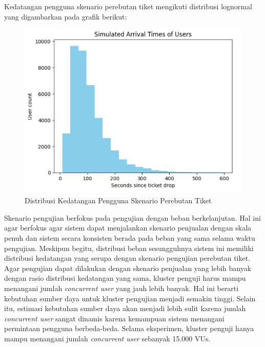 Kedatangan pengguna skenario perebutan tiket mengikuti distribusi lognormal yang digambarkan pada grafik berikut:

\begin{figure}[htbp]
    \centering
    \includegraphics[width=1\textwidth]{resources/chapter-4/arrival-sim.png}
    \caption{Distribusi Kedatangan Pengguna Skenario Perebutan Tiket}
    \label{fig:vus-arrival}
\end{figure}

Skenario pengujian berfokus pada pengujian dengan beban berkelanjutan. Hal ini agar berfokus agar sistem dapat menjalankan skenario penjualan dengan skala penuh dan sistem secara konsisten berada pada beban yang sama selama waktu pengujian. Meskipun begitu, distribusi beban sesungguhnya sistem ini memiliki distribusi kedatangan yang serupa dengan skenario pengujian perebutan tiket. Agar pengujian dapat dilakukan dengan skenario penjualan yang lebih banyak dengan rasio distribusi kedatangan yang sama, kluster penguji harus mampu menangani jumlah \textit{concurrent user} yang jauh lebih banyak. Hal ini berarti kebutuhan sumber daya untuk kluster pengujian menjadi semakin tinggi. Selain itu, estimasi kebutuhan sumber daya akan menjadi lebih sulit karena jumlah \textit{concurrent user} sangat dinamis karena kemampuan sistem menangani permintaan pengguna berbeda-beda. Selama eksperimen, kluster penguji hanya mampu menangani jumlah \textit{concurrent user} sebanyak 15.000 VUs.
